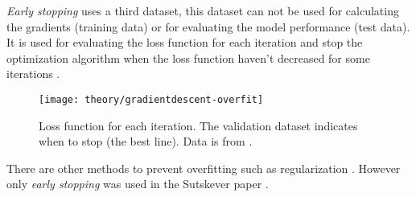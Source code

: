 \textit{Early stopping} uses a third dataset, this dataset can not be used for calculating the gradients (training data) or for evaluating the model performance (test data). It is used for evaluating the loss function for each iteration and stop the optimization algorithm when the loss function haven't decreased for some iterations \cite{the-elements-of-statistical-learning, bishop, alexgraves}.

\begin{figure}[h]
	\centering
	\texttt{[image: theory/gradientdescent-overfit]}
	\caption{Loss function for each iteration. The validation dataset indicates when to stop (the best line). Data is from \cite{alexgraves}.}
	\label{fig:theory:gradientdescent:overfit}
\end{figure}

There are other methods to prevent overfitting such as regularization \cite{the-elements-of-statistical-learning, bishop}. However only \textit{early stopping} was used in the Sutskever paper \cite{sutskever}.
